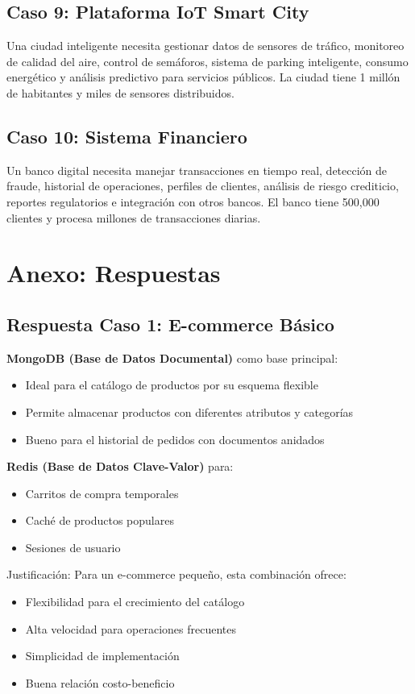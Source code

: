 \documentclass[12pt]{article}
\begin{document}
\subsection{Caso 9: Plataforma IoT Smart City}
Una ciudad inteligente necesita gestionar datos de sensores de tráfico, monitoreo de calidad del aire, control de semáforos, sistema de parking inteligente, consumo energético y análisis predictivo para servicios públicos. La ciudad tiene 1 millón de habitantes y miles de sensores distribuidos.

\subsection{Caso 10: Sistema Financiero}
Un banco digital necesita manejar transacciones en tiempo real, detección de fraude, historial de operaciones, perfiles de clientes, análisis de riesgo crediticio, reportes regulatorios e integración con otros bancos. El banco tiene 500,000 clientes y procesa millones de transacciones diarias.

\newpage
\section{Anexo: Respuestas}

\subsection{Respuesta Caso 1: E-commerce Básico}

\textbf{MongoDB (Base de Datos Documental)} como base principal:
\begin{itemize}
    \item Ideal para el catálogo de productos por su esquema flexible
    \item Permite almacenar productos con diferentes atributos y categorías
    \item Bueno para el historial de pedidos con documentos anidados
\end{itemize}

\textbf{Redis (Base de Datos Clave-Valor)} para:
\begin{itemize}
    \item Carritos de compra temporales
    \item Caché de productos populares
    \item Sesiones de usuario
\end{itemize}

Justificación: Para un e-commerce pequeño, esta combinación ofrece:
\begin{itemize}
    \item Flexibilidad para el crecimiento del catálogo
    \item Alta velocidad para operaciones frecuentes
    \item Simplicidad de implementación
    \item Buena relación costo-beneficio
\end{itemize}
\end{document}
